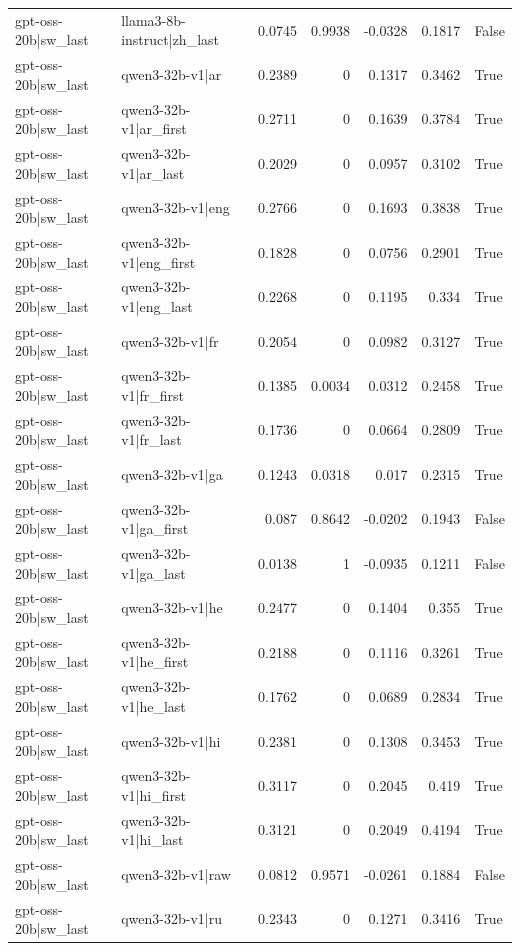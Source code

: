 \begin{table}
\begin{tabular}{l l r r r r l}
gpt-oss-20b|sw_last & llama3-8b-instruct|zh_last & 0.0745 & 0.9938 & -0.0328 & 0.1817 & False \\
gpt-oss-20b|sw_last & qwen3-32b-v1|ar & 0.2389 & 0 & 0.1317 & 0.3462 & True \\
gpt-oss-20b|sw_last & qwen3-32b-v1|ar_first & 0.2711 & 0 & 0.1639 & 0.3784 & True \\
gpt-oss-20b|sw_last & qwen3-32b-v1|ar_last & 0.2029 & 0 & 0.0957 & 0.3102 & True \\
gpt-oss-20b|sw_last & qwen3-32b-v1|eng & 0.2766 & 0 & 0.1693 & 0.3838 & True \\
gpt-oss-20b|sw_last & qwen3-32b-v1|eng_first & 0.1828 & 0 & 0.0756 & 0.2901 & True \\
gpt-oss-20b|sw_last & qwen3-32b-v1|eng_last & 0.2268 & 0 & 0.1195 & 0.334 & True \\
gpt-oss-20b|sw_last & qwen3-32b-v1|fr & 0.2054 & 0 & 0.0982 & 0.3127 & True \\
gpt-oss-20b|sw_last & qwen3-32b-v1|fr_first & 0.1385 & 0.0034 & 0.0312 & 0.2458 & True \\
gpt-oss-20b|sw_last & qwen3-32b-v1|fr_last & 0.1736 & 0 & 0.0664 & 0.2809 & True \\
gpt-oss-20b|sw_last & qwen3-32b-v1|ga & 0.1243 & 0.0318 & 0.017 & 0.2315 & True \\
gpt-oss-20b|sw_last & qwen3-32b-v1|ga_first & 0.087 & 0.8642 & -0.0202 & 0.1943 & False \\
gpt-oss-20b|sw_last & qwen3-32b-v1|ga_last & 0.0138 & 1 & -0.0935 & 0.1211 & False \\
gpt-oss-20b|sw_last & qwen3-32b-v1|he & 0.2477 & 0 & 0.1404 & 0.355 & True \\
gpt-oss-20b|sw_last & qwen3-32b-v1|he_first & 0.2188 & 0 & 0.1116 & 0.3261 & True \\
gpt-oss-20b|sw_last & qwen3-32b-v1|he_last & 0.1762 & 0 & 0.0689 & 0.2834 & True \\
gpt-oss-20b|sw_last & qwen3-32b-v1|hi & 0.2381 & 0 & 0.1308 & 0.3453 & True \\
gpt-oss-20b|sw_last & qwen3-32b-v1|hi_first & 0.3117 & 0 & 0.2045 & 0.419 & True \\
gpt-oss-20b|sw_last & qwen3-32b-v1|hi_last & 0.3121 & 0 & 0.2049 & 0.4194 & True \\
gpt-oss-20b|sw_last & qwen3-32b-v1|raw & 0.0812 & 0.9571 & -0.0261 & 0.1884 & False \\
gpt-oss-20b|sw_last & qwen3-32b-v1|ru & 0.2343 & 0 & 0.1271 & 0.3416 & True \\

\end{tabular}
\end{table}
